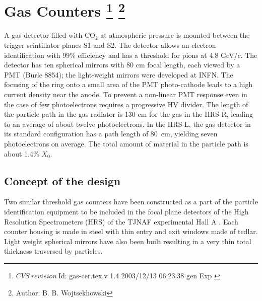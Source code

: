 \chapter[Gas \Cherenkov{} Counters]{Gas \Cherenkov{} Counters
\footnote{
  $CVS~revision~ $Id: gas-cer.tex,v 1.4 2003/12/13 06:23:38 gen Exp $ $
}
\footnote{Author: B. B. Wojtsekhowski }
}

A gas \Cherenkov{} detector filled  with CO$_{2}$ at atmospheric 
pressure is mounted between the trigger scintillator planes S1 and S2. 
The detector allows an electron identification
with 99\% efficiency and has a threshold for pions at 4.8 GeV/$c$.
The detector has ten spherical mirrors with 80 cm focal length, each
viewed by a PMT (Burle 8854);
the light-weight mirrors were developed at INFN.
The focusing of the \Cherenkov{} ring onto a
small area of the PMT photo-cathode leads to a high current density  near
the anode. To prevent a non-linear PMT response even in the case of few
photoelectrons requires a progressive HV divider.
The length of the particle path in the gas radiator is 130 cm for the gas
\Cherenkov{} in the HRS-R, leading to an average of about twelve photoelectrons.
In the HRS-L, the gas \Cherenkov{} detector in its standard configuration has
a path length of 80~cm, yielding seven photoelectrons on average.
The total amount of material in the particle path is about 1.4\% $X_0$.

\section[Concept of the design]{Concept of the design}

Two similar threshold gas \Cherenkov{} counters have been constructed 
as a part of the particle identification equipment to be included 
in the focal plane detectors of the High Resolution Spectrometers (HRS) 
of the TJNAF experimental Hall A%
. 
Each counter housing is made in steel with thin entry and 
exit windows made of tedlar.
Light weight spherical mirrors have also been built resulting in 
a very thin total thickness traversed by particles. 
%

